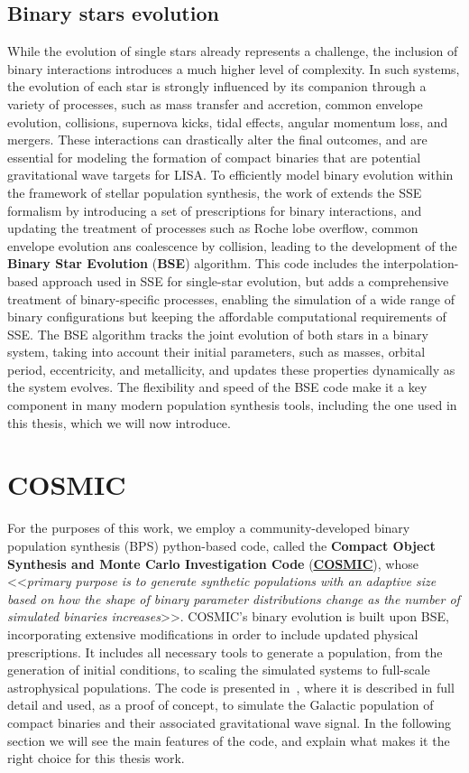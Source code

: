 \subsection{Binary stars evolution}
While the evolution of single stars already represents a challenge, the inclusion of binary interactions introduces a much higher level of complexity.
In such systems, the evolution of each star is strongly influenced by its companion through a variety of processes, such as mass transfer and accretion, common envelope evolution, collisions, supernova kicks, tidal effects, angular momentum loss, and mergers.
These interactions can drastically alter the final outcomes, and are essential for modeling the formation of compact binaries that are potential gravitational wave targets for LISA.
To efficiently model binary evolution within the framework of stellar population synthesis, the work of \cite{BSE} extends the SSE formalism by introducing a set of prescriptions for binary interactions, and updating the treatment of processes such as Roche lobe overflow, common envelope evolution ans coalescence by collision, leading to the development of the \textbf{Binary Star Evolution} (\textbf{BSE}) algorithm.
This code includes the interpolation-based approach used in SSE for single-star evolution, but adds a comprehensive treatment of binary-specific processes, enabling the simulation of a wide range of binary configurations but keeping the affordable computational requirements of SSE.
The BSE algorithm tracks the joint evolution of both stars in a binary system, taking into account their initial parameters, such as masses, orbital period, eccentricity, and metallicity, and updates these properties dynamically as the system evolves.
The flexibility and speed of the BSE code make it a key component in many modern population synthesis tools, including the one used in this thesis, which we will now introduce.

\section{COSMIC}
For the purposes of this work, we employ a community-developed binary population synthesis (BPS) python-based code, called the \textbf{Compact Object Synthesis and Monte Carlo Investigation Code} (\underline{\textbf{\href{https://cosmic-popsynth.github.io/docs/stable/pages/about.html}{COSMIC}}}), whose <<\textit{primary purpose is to generate synthetic populations with an adaptive size based on how the shape of binary parameter distributions change as the number of simulated binaries increases}>>. 
COSMIC's binary evolution is built upon BSE, incorporating extensive modifications in order to include updated physical prescriptions.
It  includes all necessary tools to generate a population, from the generation of initial conditions, to scaling the simulated systems to full-scale astrophysical populations.
The code is presented in~\cite{Breivik}, where it is described in full detail and used, as a proof of concept, to simulate the Galactic population of compact binaries and their associated gravitational wave signal.
In the following section we will see the main features of the code, and explain what makes it the right choice for this thesis work.

